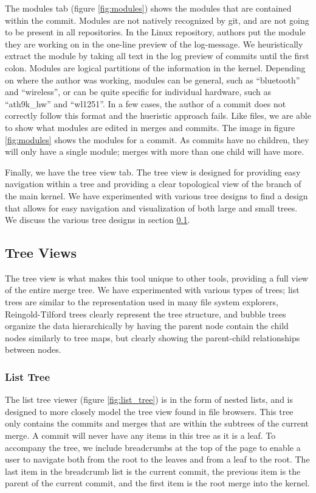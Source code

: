 \documentclass[conference, draftclsnofoot, draft]{IEEEtran}
\begin{document}
The modules tab (figure \ref{fig:modules}) shows the modules that are contained
within the commit. Modules are not natively recognized by git, and are not going to
be present in all repositories.  In the Linux repository, authors put the module
they are working on in the one-line preview of the log-message. We heuristically
extract the module by taking all text in the log preview of commits until the first
colon.  Modules are logical partitions of the information in the kernel. Depending
on where the author was working, modules can be general, such as ``bluetooth'' and
``wireless'', or can be quite specific for individual hardware, such as
``ath9k\_hw'' and ``wl1251''. In a few cases, the author of a commit does not
correctly follow this format and the hueristic approach fails. Like files, we are
able to show what modules are edited in merges and commits. The image in figure
\ref{fig:modules} shows the modules for a commit.  As commits have no children, they
will only have a single module; merges with more than one child will have more.

Finally, we have the tree view tab. The tree view is designed for providing easy
navigation within a tree and providing a clear topological view of the branch of the
main kernel. We have experimented with various tree designs to find a design that
allows for easy navigation and visualization of both large and small trees. We
discuss the various tree designs in section \ref{treeview_section}.

\subsection{Tree Views} \label{treeview_section}

The tree view is what makes this tool unique to other tools, providing a full view
of the entire merge tree. We have experimented with various types of trees; list
trees are similar to the representation used in many file system explorers,
Reingold-Tilford trees clearly represent the tree structure, and bubble trees
organize the data hierarchically by having the parent node contain the child nodes
similarly to tree maps, but clearly showing the parent-child relationships between
nodes.

\subsubsection{List Tree}

The list tree viewer (figure \ref{fig:list_tree}) is in the form of nested lists,
and is designed to more closely model the tree view found in file browsers. This
tree only contains the commits and merges that are within the subtrees of the
current merge. A commit will never have any items in this tree as it is a leaf. To
accompany the tree, we include breadcrumbs at the top of the page to enable a user
to navigate both from the root to the leaves and from a leaf to the root. The last
item in the breadcrumb list is the current commit, the previous item is the parent
of the current commit, and the first item is the root merge into the kernel.
\end{document}
